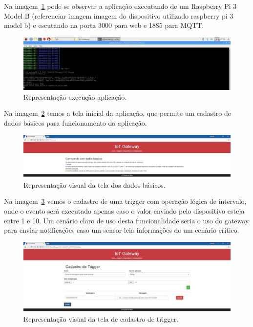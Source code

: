 Na imagem~\ref{fig:raspberryDistroRaspbian} pode-se observar a aplicação executando de um Raspberry Pi 3 Model B (referenciar imagem imagem do dispositivo utilizado raspberry pi 3 model b) e escutando na porta 3000 para web e 1885 para MQTT.
\begin{figure}[h!]
	\begin{center}
		\includegraphics[width=1.085\textwidth]{./img/raspberryDistroRaspbian}
		\caption{Representação execução aplicação.}
		\label{fig:raspberryDistroRaspbian}
	\end{center}
\end{figure}

Na imagem~\ref{fig:dadosBasicos} temos a tela inicial da aplicação, que permite um cadastro de dados básicos para funcionamento da aplicação.
\begin{figure}[h!]
	\begin{center}
		\includegraphics[width=1.085\textwidth]{./img/dadosBasicos}
		\caption{Representação visual da tela dos dados básicos.}
		\label{fig:dadosBasicos}
	\end{center}
\end{figure}

Na imagem~\ref{fig:triggerCadastrada} vemos o cadastro de uma trigger com operação lógica de intervalo, onde o evento será executado apenas caso o valor enviado pelo dispositivo esteja entre 1 e 10. Um cenário claro de uso desta funcionalidade seria o uso do gateway para enviar notificações caso um sensor leia informações de um cenário crítico.
\begin{figure}[h!]
	\begin{center}
		\includegraphics[width=1.085\textwidth]{./img/triggerCadastrada}
		\caption{Representação visual da tela de cadastro de trigger.}
		\label{fig:triggerCadastrada}
	\end{center}
\end{figure}

